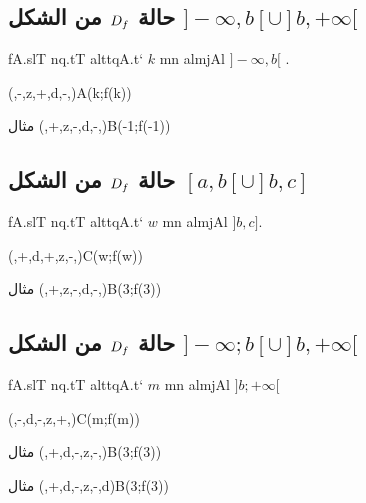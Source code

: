 \documentclass[12pt,a4paper]{article}
\begin{document}
\subsection{حالة $D\sb{f}$ من الشكل $]-\infty,b[\cup ]b,+\infty[$ }
\begin{myboxe}{ \begin{arab}
 fA.slT nq.tT alttqA.t` $k$ mn almjAl  $]-\infty,b[$ .
\end{arab}}
(,-,z,+,d,-,){A(k;f(k))} 
\end{myboxe}
%
\begin{boxe}{مثال }
(,+,z,-,d,-,){B(-1;f(-1))} 
\end{boxe}
%
\subsection{حالة $D\sb{f}$ من الشكل $[a,b[\cup ]b,c]$ }
\begin{myboxe}{ \begin{arab}
fA.slT nq.tT alttqA.t` $w$ mn almjAl  $]b,c]$.
\end{arab}}
\posad[a,b ,w,c](,+,d,+,z,-,){C(w;f(w))} 
\end{myboxe}
%
\begin{boxe}{مثال }
\posad[-4,-1,3,4](,+,z,-,d,-,){B(3;f(3))}
\end{boxe}
%
\subsection{حالة $D\sb{f}$ من الشكل $]-\infty;b[\cup ]b,+\infty[$ }
%
\begin{myboxe}{ \begin{arab}
  fA.slT nq.tT alttqA.t` $m$ mn almjAl  $]b;+\infty[$ 
\end{arab}}
(,-,d,-,z,+,){C(m;f(m))}
\end{myboxe}
%
\begin{boxe}{مثال }
(,+,d,-,z,-,){B(3;f(3))}
\end{boxe}
\newpage
\begin{boxe}{مثال }
\posad[-\infty,-1,3,6](,+,d,-,z,-,d){B(3;f(3))}
\end{boxe}
%
\end{document}
